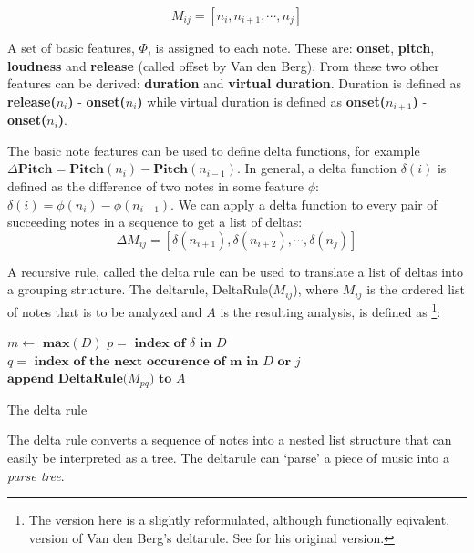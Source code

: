 \documentclass[a4paper,10pt]{article}
\begin{document}
\[M_{ij} = [n_i, n_{i+1}, \cdots, n_j]\]

A set of basic features, $\Phi$, is assigned to each note. These are: \textbf{onset}, \textbf{pitch}, \textbf{loudness} and \textbf{release} (called offset by Van den Berg). From these two other features can be derived: \textbf{duration} and \textbf{virtual duration}. Duration is defined as \textbf{release($n_i$)} - \textbf{onset($n_i$)} while virtual duration is defined as \textbf{onset($n_{i+1}$)} - \textbf{onset($n_i$)}. 

The basic note features can be used to define delta functions, for example $\Delta\textbf{Pitch} = \textbf{Pitch}(n_i) - \textbf{Pitch}(n_{i-1})$. In general, a delta function $\delta(i)$ is defined as the difference of two notes in some feature $\phi$: $\delta(i) = \phi(n_i) - \phi(n_{i-1})$. We can apply a delta function to every pair of succeeding notes in a sequence to get a list of deltas: 
\[\Delta M_{ij} = [\delta(n_{i+1}), \delta(n_{i+2}), \cdots, \delta(n_{j})]\]

A recursive rule, called the delta rule can be used to translate a list of deltas into a grouping structure. The deltarule, DeltaRule($M_{ij}$), where $M_{ij}$ is the ordered list of notes that is to be analyzed and $A$ is the resulting analysis, is defined as \footnote{The version here is a slightly reformulated, although functionally eqivalent, version of Van den Berg's deltarule. See \cite{markwin} for his original version.}:
\begin{algorithm}
\begin{algorithmic}
\STATE $m \leftarrow \textbf{ max}(D)$
\STATE $p = \textbf{ index of }\delta \textbf{ in } D$
\STATE $q = \textbf{ index of the next occurence of m in }D \textbf{ or } j$
\STATE $\textbf{append DeltaRule(}M_{pq}\textbf{) to } A$
\ENDIF
\ENDFOR
{}
\end{algorithmic}
\caption{The delta rule}
\label{deltarule}
\end{algorithm}

The delta rule converts a sequence of notes into a nested list structure that can easily be interpreted as a tree. The deltarule can `parse' a piece of music into a \textit{parse tree}.
\end{document}
